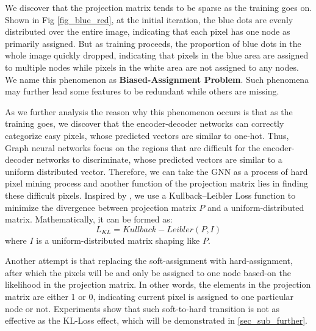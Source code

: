﻿\documentclass[journal]{IEEEtran}
\begin{document}
 
    We discover that the projection matrix tends to be sparse as the training goes on. Shown in Fig \ref{fig_blue_red}, at the initial iteration, the blue dots are evenly distributed over the entire image, indicating that each pixel has one node as primarily assigned. But as training proceeds, the proportion of blue dots in the whole image quickly dropped, indicating that pixels in the blue area are assigned to multiple nodes while pixels in the white area are not assigned to any nodes. We name this phenomenon as \textbf{Biased-Assignment Problem}. Such phenomena may further lead some features to be redundant while others are missing.

    As we further analysis the reason why this phenomenon occurs is that as the training goes, we discover that the encoder-decoder networks can correctly categorize easy pixels, whose predicted vectors are similar to one-hot. Thus, Graph neural networks focus on the regions that are difficult for the encoder-decoder networks to discriminate, whose predicted vectors are similar to a uniform distributed vector. Therefore, we can take the GNN as a process of hard pixel mining process and another function of the projection matrix lies in finding these difficult pixels. Inspired by \cite{li2018beyondgrids}, we use a Kullback–Leibler Loss function to minimize the divergence between projection matrix $P$ and a uniform-distributed matrix. Mathematically, it can be formed as:
    \begin{equation}\label{loss_kl}
        L_{KL} = Kullback-Leibler(P, I)
    \end{equation}
    where $I$ is a uniform-distributed matrix shaping like $P$.
    
    Another attempt is that replacing the soft-assignment with hard-assignment, after which the pixels will be and only be assigned to one node based-on the likelihood in the projection matrix. In other words, the elements in the projection matrix are either 1 or 0, indicating current pixel is assigned to one particular node or not. Experiments show that such soft-to-hard transition is not as effective as the KL-Loss effect, which will be demonstrated in \ref{sec_sub_further}.
    
    
\end{document}
